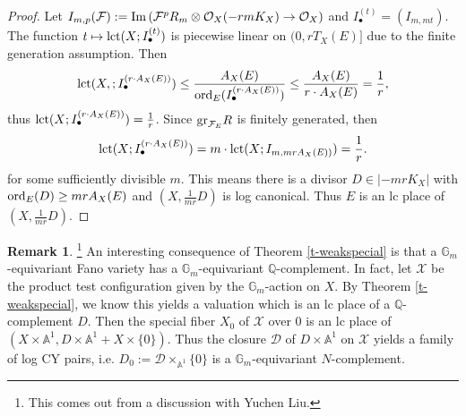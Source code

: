 \documentclass[12pt,reqno]{amsart}%
\newcommand{\bG}{{\mathbb{G} }}
\newcommand{\cX}{{\mathcal{X}}}
\newcommand{\cF}{\mathcal{F}}
\newcommand{\ord}{{\rm ord}}
\theoremstyle{definition}
\newtheorem{rem}[thm]{Remark}
\theoremstyle{remark}
\newcommand{\cO}{{\mathcal{O}}}
\newcommand{\lct}{{\rm lct}}
\begin{document}
\begin{proof}
Let $I_{m,p}(\cF):={\rm Im} \left(  \cF^p R_m \otimes \cO_{X}(-rmK_X) \to \cO_X\right)$ and $I^{(t)}_{\bullet}=(I_{m,mt})$. The function $t\mapsto \lct(X;I^{(t)}_\bullet)$ is  piecewise linear  on $(0,rT_{X}(E)]$ due to the finite generation assumption.
Then
\[
\lct(X,;I^{(r\cdot A_{X}(E))}_\bullet)\le \frac{A_{X}(E)}{\ord_E(I^{(r\cdot A_{X}(E))}_\bullet)}\le \frac{A_{X}(E)}{r\cdot A_{X}(E)} = \frac{1}{r},
\]
thus $\lct(X;I^{(r\cdot A_{X}(E))}_\bullet) = \frac{1}{r}$.
Since ${\rm gr}_{\cF_E}R$ is finitely generated, then
\[
\lct(X;I^{ (r\cdot A_{X}(E))}_\bullet)=m\cdot \lct(X;I_{m, mrA_{X}(E))})= \frac{1}{r}.
\]
for some sufficiently divisible $m$. This means there is a divisor $D\in |-mrK_X|$ with $\ord_E(D)\ge mrA_{X}(E)$ and $(X,\frac{1}{mr}D)$ is log canonical. Thus $E$ is an lc place of $(X,\frac{1}{mr}D)$.  
\end{proof}
\begin{rem}\footnote{This comes out from a discussion with Yuchen Liu.} An interesting consequence of Theorem \ref{t-weakspecial} is that a $\mathbb{G}_m$-equivariant Fano variety has a $\bG_m$-equivariant $\mathbb{Q}$-complement. In fact, let $\cX$  be the product test configuration given by the $\mathbb{G}_m$-action on $X$. By Theorem \ref{t-weakspecial},  we know this yields a valuation which is an lc place of a $\mathbb{Q}$-complement $D$. Then the special fiber $X_0$ of $\cX$ over $0$ is an lc place of $(X\times \mathbb{A}^1,D\times \mathbb{A}^1+X\times \{0\})$. Thus the closure $\mathcal D$ of $D\times \mathbb{A}^1$ on $\cX$ yields a family of log CY pairs, i.e. $D_0:=\mathcal{D}\times_{\mathbb A^1}\{0\}$ is a $\bG_m$-equivariant $N$-complement. 
\end{rem}
\end{document}
